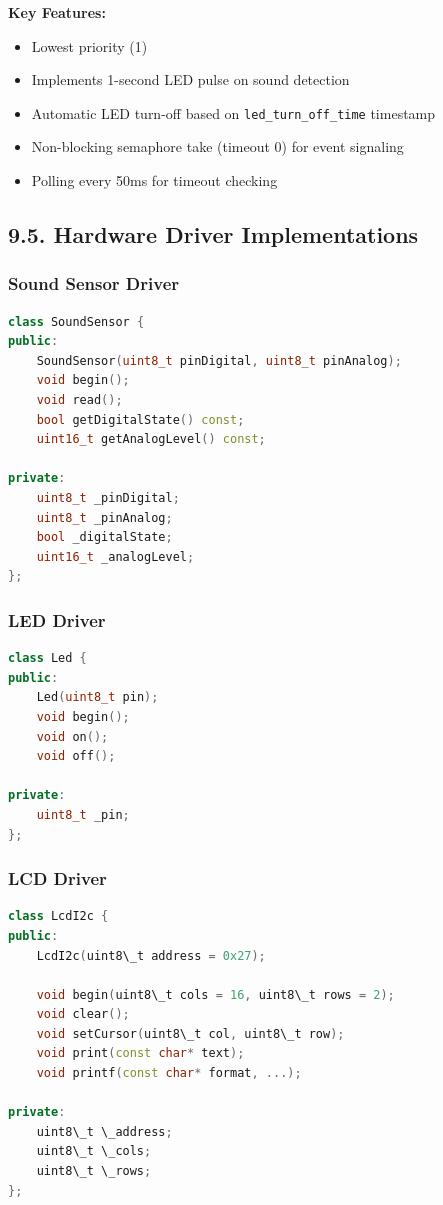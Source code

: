 \documentclass[12pt]{article}
\begin{document}
\textbf{Key Features:}
\begin{itemize}
    \item Lowest priority (1)
    \item Implements 1-second LED pulse on sound detection
    \item Automatic LED turn-off based on \texttt{led\_turn\_off\_time} timestamp
    \item Non-blocking semaphore take (timeout 0) for event signaling
    \item Polling every 50ms for timeout checking
\end{itemize}

\subsection*{9.5. Hardware Driver Implementations}

\subsubsection*{Sound Sensor Driver}

\begin{lstlisting}[language=C++, caption=Sound Sensor Driver Interface (sound\_sensor.h)]
class SoundSensor {
public:
    SoundSensor(uint8_t pinDigital, uint8_t pinAnalog);
    void begin();
    void read();
    bool getDigitalState() const;
    uint16_t getAnalogLevel() const;

private:
    uint8_t _pinDigital;
    uint8_t _pinAnalog;
    bool _digitalState;
    uint16_t _analogLevel;
};
\end{lstlisting}

\subsubsection*{LED Driver}

\begin{lstlisting}[language=C++, caption=LED Driver Interface (led.h)]
class Led {
public:
    Led(uint8_t pin);
    void begin();
    void on();
    void off();

private:
    uint8_t _pin;
};
\end{lstlisting}

\subsubsection*{LCD Driver}

\begin{lstlisting}[language=C++, caption=LCD Driver Interface (lcd.h)]
class LcdI2c {
public:
    LcdI2c(uint8\_t address = 0x27);
    
    void begin(uint8\_t cols = 16, uint8\_t rows = 2);
    void clear();
    void setCursor(uint8\_t col, uint8\_t row);
    void print(const char* text);
    void printf(const char* format, ...);
    
private:
    uint8\_t \_address;
    uint8\_t \_cols;
    uint8\_t \_rows;
};
\end{lstlisting}
\end{document}
